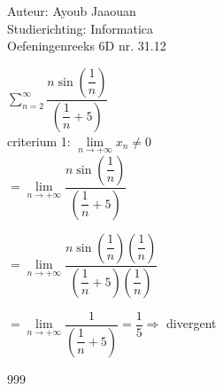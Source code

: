 \documentclass[a4paper]{article}
\begin{document}
\noindent \large Auteur: Ayoub Jaaouan \\
\noindent \large Studierichting: Informatica\\
\noindent \large Oefeningenreeks 6D nr. 31.12\\
\medskip

\normalsize

$\displaystyle\sum\limits_{n=2}^{\infty} \dfrac{n\sin\left(\dfrac{1}{n}\right)}{\left(\dfrac{1}{n}+5\right)}$\\

criterium 1: $\lim\limits_{n \rightarrow +\infty} x_n \neq 0$ \\

$ = \lim\limits_{n \rightarrow +\infty}  \dfrac{n\sin\left(\dfrac{1}{n}\right)}{\left(\dfrac{1}{n}+5\right)}$

$=\lim\limits_{n \rightarrow +\infty}  \dfrac{n\sin\left(\dfrac{1}{n}\right)\left(\dfrac{1}{n}\right)}{\left(\dfrac{1}{n}+5\right)\left(\dfrac{1}{n}\right)}$

$= \lim\limits_{n \rightarrow +\infty}  \dfrac{1}{\left(\dfrac{1}{n}+5\right)} = \dfrac{1}{5} \Rightarrow $ divergent



	


\begin{thebibliography}{999}
\end{thebibliography}
\end{document}
